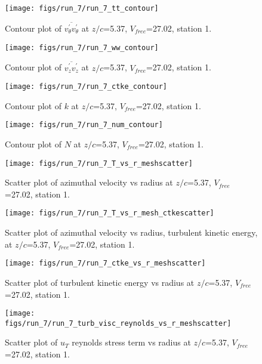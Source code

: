 \begin{figure}[H]
\centering
\texttt{[image: figs/run\_7/run\_7\_tt\_contour]}
\caption{Contour plot of $\overline{v_{\theta}^{\prime} v_{\theta}^{\prime}}$ at $z/c$=5.37, $V_{free}$=27.02, station 1.}
\end{figure}


\begin{figure}[H]
\centering
\texttt{[image: figs/run\_7/run\_7\_ww\_contour]}
\caption{Contour plot of $\overline{v_{z}^{\prime} v_{z}^{\prime}}$ at $z/c$=5.37, $V_{free}$=27.02, station 1.}
\end{figure}


\begin{figure}[H]
\centering
\texttt{[image: figs/run\_7/run\_7\_ctke\_contour]}
\caption{Contour plot of $k$ at $z/c$=5.37, $V_{free}$=27.02, station 1.}
\end{figure}


\begin{figure}[H]
\centering
\texttt{[image: figs/run\_7/run\_7\_num\_contour]}
\caption{Contour plot of $N$ at $z/c$=5.37, $V_{free}$=27.02, station 1.}
\end{figure}


\begin{figure}[H]
\centering
\texttt{[image: figs/run\_7/run\_7\_T\_vs\_r\_meshscatter]}
\caption{Scatter plot of azimuthal velocity vs radius at $z/c$=5.37, $V_{free}$=27.02, station 1.}
\end{figure}


\begin{figure}[H]
\centering
\texttt{[image: figs/run\_7/run\_7\_T\_vs\_r\_mesh\_ctkescatter]}
\caption{Scatter plot of azimuthal velocity vs radius, turbulent kinetic energy, at $z/c$=5.37, $V_{free}$=27.02, station 1.}
\end{figure}


\begin{figure}[H]
\centering
\texttt{[image: figs/run\_7/run\_7\_ctke\_vs\_r\_meshscatter]}
\caption{Scatter plot of turbulent kinetic energy vs radius at $z/c$=5.37, $V_{free}$=27.02, station 1.}
\end{figure}


\begin{figure}[H]
\centering
\texttt{[image: figs/run\_7/run\_7\_turb\_visc\_reynolds\_vs\_r\_meshscatter]}
\caption{Scatter plot of $
u_T$ reynolds stress term vs radius at $z/c$=5.37, $V_{free}$=27.02, station 1.}
\end{figure}


